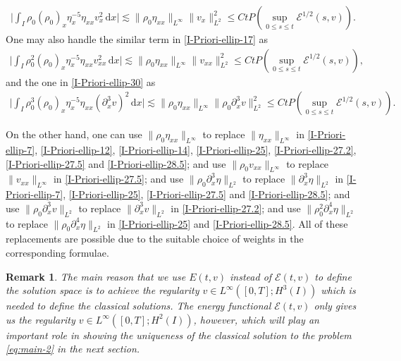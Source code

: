 \documentclass[11pt, reqno]{amsart}
\newcommand{\diff}{\mathrm{d}}
\newtheorem{remark}{Remark}
\numberwithin{equation}{section}
\begin{document}
{\begin{equation*}
	\begin{aligned}
		\bigg|\int_I\rho_0(\rho_0)_x\eta_x^{-5}\eta_{xx}v_x^2\,\diff x\bigg|
		\lesssim
		\|\rho_0\eta_{xx}\|_{L^\infty}\|v_x\|_{L^2}^2
		\leq Ct P(\sup_{0\leq s\leq t}\mathcal{E}^{1/2}(s,v)).
	\end{aligned}
\end{equation*}	
One may also handle the similar term in \eqref{I-Priori-ellip-17} as
\begin{equation*}
	\begin{aligned}
		\bigg|\int_I\rho_0^2(\rho_0)_x\eta_x^{-5}\eta_{xx}v_{xx}^2\,\diff x\bigg|
		\lesssim
		\|\rho_0\eta_{xx}\|_{L^\infty}\|v_{xx}\|_{L^2}^2
		\leq Ct P(\sup_{0\leq s\leq t}\mathcal{E}^{1/2}(s,v)),
	\end{aligned}
\end{equation*}
and the one in \eqref{I-Priori-ellip-30} as
\begin{equation*}
	\begin{aligned}
		\bigg|\int_I\rho_0^3(\rho_0)_x\eta_x^{-5}\eta_{xx}(\partial_x^3v)^2\,\diff x\bigg|
		\lesssim
		\|\rho_0\eta_{xx}\|_{L^\infty}\|\rho_0\partial_x^3v\|_{L^2}^2
		\leq Ct P(\sup_{0\leq s\leq t}\mathcal{E}^{1/2}(s,v)).
	\end{aligned}
\end{equation*}

On the other hand, one can use \(\|\rho_0\eta_{xx}\|_{L^\infty}\) to replace \(\|\eta_{xx}\|_{L^\infty}\) in \eqref{I-Priori-ellip-7}, \eqref{I-Priori-ellip-12}, \eqref{I-Priori-ellip-14}, \eqref{I-Priori-ellip-25}, \eqref{I-Priori-ellip-27.2}, \eqref{I-Priori-ellip-27.5} and  \eqref{I-Priori-ellip-28.5}; and use
\(\|\rho_0v_{xx}\|_{L^\infty}\) to replace \(\|v_{xx}\|_{L^\infty}\) in \eqref{I-Priori-ellip-27.5}; and use
\(\|\rho_0\partial_x^3\eta\|_{L^2}\) to replace \(\|\partial_x^3\eta\|_{L^2}\) in \eqref{I-Priori-ellip-7}, \eqref{I-Priori-ellip-25}, \eqref{I-Priori-ellip-27.5} and  \eqref{I-Priori-ellip-28.5}; and use \(\|\rho_0\partial_x^3v\|_{L^2}\) to replace \(\|\partial_x^3v\|_{L^2}\) in \eqref{I-Priori-ellip-27.2}; and use \(\|\rho_0^2\partial_x^4\eta\|_{L^2}\) to replace \(\|\rho_0\partial_x^4\eta\|_{L^2}\) in \eqref{I-Priori-ellip-25} and \eqref{I-Priori-ellip-28.5}. All of these replacements are possible due to the suitable choice of weights in the corresponding formulae.








\begin{remark} The main reason that we use \(E(t,v)\) instead of \(\mathcal{E}(t,v)\) to define the solution space is to achieve the regularity  \(v\in L^\infty([0,T]; H^3(I))\) which is needed to define the classical solutions. The energy functional \(\mathcal{E}(t,v)\) only gives us the regularity \(v\in L^\infty([0,T]; H^2(I))\), however, which will play an important role in showing the uniqueness of the classical solution to the problem \eqref{eq:main-2} in the next section.
	

\end{remark}}
\end{document}

